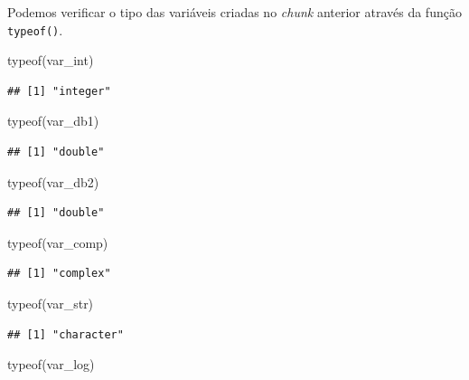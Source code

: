 \documentclass[
]{book}
\newenvironment{Shaded}{\begin{snugshade}}{\end{snugshade}}
\newcommand{\FunctionTok}[1]{\textcolor[rgb]{0.00,0.00,0.00}{#1}}
\newcommand{\NormalTok}[1]{#1}
\theoremstyle{definition}
\theoremstyle{definition}
\theoremstyle{definition}
\theoremstyle{definition}
\theoremstyle{remark}
\begin{document}
Podemos verificar o tipo das variáveis criadas no \emph{chunk} anterior através da função \texttt{typeof()}.

\begin{Shaded}
\begin{Highlighting}[]
\FunctionTok{typeof}\NormalTok{(var\_int)}
\end{Highlighting}
\end{Shaded}

\begin{verbatim}
## [1] "integer"
\end{verbatim}

\begin{Shaded}
\begin{Highlighting}[]
\FunctionTok{typeof}\NormalTok{(var\_db1)}
\end{Highlighting}
\end{Shaded}

\begin{verbatim}
## [1] "double"
\end{verbatim}

\begin{Shaded}
\begin{Highlighting}[]
\FunctionTok{typeof}\NormalTok{(var\_db2)}
\end{Highlighting}
\end{Shaded}

\begin{verbatim}
## [1] "double"
\end{verbatim}

\begin{Shaded}
\begin{Highlighting}[]
\FunctionTok{typeof}\NormalTok{(var\_comp)}
\end{Highlighting}
\end{Shaded}

\begin{verbatim}
## [1] "complex"
\end{verbatim}

\begin{Shaded}
\begin{Highlighting}[]
\FunctionTok{typeof}\NormalTok{(var\_str)}
\end{Highlighting}
\end{Shaded}

\begin{verbatim}
## [1] "character"
\end{verbatim}

\begin{Shaded}
\begin{Highlighting}[]
\FunctionTok{typeof}\NormalTok{(var\_log)}
\end{Highlighting}
\end{Shaded}
\end{document}
